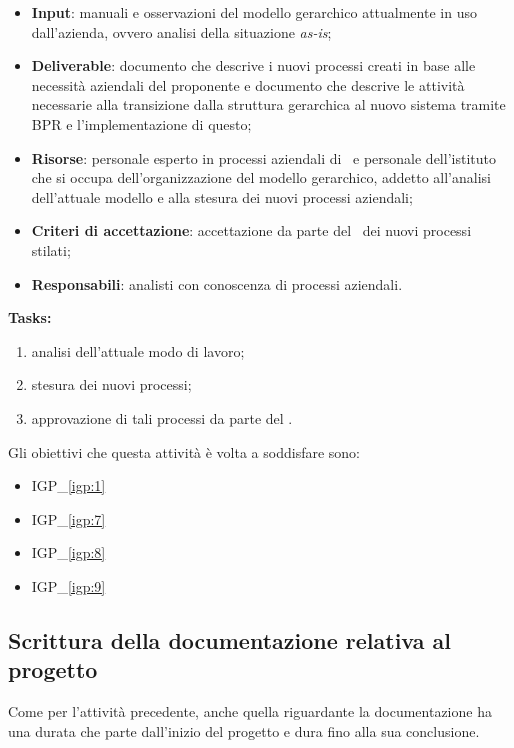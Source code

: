 		\begin{itemize}[noitemsep]
			\renewcommand\labelitemi{--}
			\item \textbf{Input}: manuali e osservazioni del modello gerarchico attualmente in uso dall'azienda, ovvero analisi della situazione \textit{as-is};
			\item \textbf{Deliverable}: documento che descrive i nuovi processi creati in base alle necessità aziendali del proponente e documento che descrive le attività necessarie alla transizione dalla struttura gerarchica al nuovo sistema tramite BPR e l'implementazione di questo;
			\item \textbf{Risorse}: personale esperto in processi aziendali di \azienda~e personale dell'istituto che si occupa dell'organizzazione del modello gerarchico, addetto all'analisi dell'attuale modello e alla stesura dei nuovi processi aziendali;
			\item \textbf{Criteri di accettazione}: accettazione da parte del \proponente~dei nuovi processi stilati;
			\item \textbf{Responsabili}: analisti con conoscenza di processi aziendali.
		\end{itemize}
	
		\textbf{Tasks:}
		\begin{enumerate}[noitemsep]
			\item analisi dell'attuale modo di lavoro;
			\item stesura dei nuovi processi;
			\item approvazione di tali processi da parte del \proponente.
		\end{enumerate}
	
		Gli obiettivi che questa attività è volta a soddisfare sono:
		\begin{itemize}[noitemsep]
			\renewcommand\labelitemi{--}
			\item {\color{pantone}IGP\_\ref{igp:1}}
			\item {\color{pantone}IGP\_\ref{igp:7}}
			\item {\color{pantone}IGP\_\ref{igp:8}}
			\item {\color{pantone}IGP\_\ref{igp:9}}
		\end{itemize}

	\subsection{Scrittura della documentazione relativa al progetto}
	
		Come per l'attività precedente, anche quella riguardante la documentazione ha una durata che parte dall'inizio del progetto e dura fino alla sua conclusione.
		
